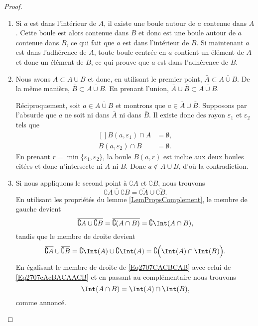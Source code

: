 \begin{proof}
	\begin{enumerate}
		\item
			Si $a$ est dans l'intérieur de $A$, il existe une boule autour de $a$ contenue dans $A$. Cette boule est alors contenue dans $B$ et donc est une boule autour de $a$ contenue dans $B$, ce qui fait que $a$ est dans l'intérieur de $B$. Si maintenant $a$ est dans l'adhérence de $A$, toute boule centrée en $a$ contient un élément de $A$ et donc un élément de $B$, ce qui prouve que $a$ est dans l'adhérence de $B$.
		\item
			Nous avons $A\subset A\cup B$ et donc, en utilisant le premier point, $\bar A\subset\overline{ A\cup B }$. De la même manière, $\bar B\subset\overline{ A\cup B }$. En prenant l'union, $\bar A\cup\bar B\subset\overline{ A\cup B }$.

			Réciproquement, soit $a\in\overline{ A\cup B }$ et montrons que $a\in\bar A\cup\bar B$. Supposons par l'absurde que $a$ ne soit ni dans $\bar A$ ni dans $\bar B$. Il existe donc des rayon $\varepsilon_1$ et $\varepsilon_2$ tels que
			\begin{equation}
				\begin{aligned}[]
					B(a,\varepsilon_1)\cap A&=\emptyset,\\
					B(a,\varepsilon_2)\cap B&=\emptyset.
				\end{aligned}
			\end{equation}
			En prenant $r=\min\{ \varepsilon_1,\varepsilon_2 \}$, la boule $B(a,r)$ est inclue aux deux boules citées et donc n'intersecte ni $A$ ni $B$. Donc $a\notin\overline{ A\cup B }$, d'où la contradiction.

		\item
			Si nous appliquons le second point à $\complement A$ et $\complement B$, nous trouvons
			\begin{equation}
				\overline{ \complement A\cup\complement B }=\overline{ \complement A}\cup\overline{ \complement B}.
			\end{equation}
			En utilisant les propriétés du lemme \ref{LemPropsComplement}, le membre de gauche devient
			\begin{equation}	\label{Eq2707CACBCAB}
				\overline{ \complement A\cup\complement B }=\overline{ \complement(A\cap B) }=\complement\Int(A\cap B),
			\end{equation}
			tandis que le membre de droite devient
			\begin{equation}		\label{Eq2707cAcBACAACB}
				\overline{ \complement A }\cup\overline{ \complement B }=\complement\Int(A)\cup\complement\Int(A)=\complement\Big( \Int(A)\cap\Int(B) \Big).
			\end{equation}
			En égalisant le membre de droite de \eqref{Eq2707CACBCAB} avec celui de \eqref{Eq2707cAcBACAACB} et en passant au complémentaire nous trouvons
			\begin{equation}
				\Int(A\cap B)=\Int(A)\cap\Int(B),
			\end{equation}
			comme annoncé.


\end{enumerate}
\end{proof}
